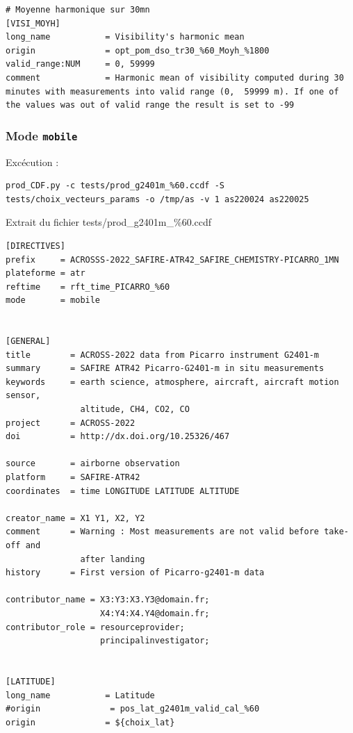 \begin{landscape}
\begin{Verbatim}[fontsize=\myfontsize, commandchars=\\\{\}]
# Moyenne harmonique sur 30mn
[VISI_MOYH]
long_name           = Visibility's harmonic mean
origin              = opt_pom_dso_tr30_%60_Moyh_%1800
valid_range:NUM     = 0, 59999
comment             = Harmonic mean of visibility computed during 30 minutes with measurements into valid range (0,  59999 m). If one of the values was out of valid range the result is set to -99
\end{Verbatim}

\subsubsection{Mode \texttt{mobile}}

Excécution :

\begin{Verbatim}[fontsize=\myfontsize, commandchars=\\\{\}]
prod_CDF.py -c tests/prod_g2401m_%60.ccdf -S tests/choix_vecteurs_params -o /tmp/as -v 1 as220024 as220025
\end{Verbatim}

Extrait du fichier tests/prod\_g2401m\_\%60.ccdf

\begin{Verbatim}[fontsize=\myfontsize, commandchars=\\\{\}]
[DIRECTIVES]
prefix     = ACROSSS-2022_SAFIRE-ATR42_SAFIRE_CHEMISTRY-PICARRO_1MN
plateforme = atr
reftime    = rft_time_PICARRO_%60
mode       = mobile


[GENERAL]
title        = ACROSS-2022 data from Picarro instrument G2401-m
summary      = SAFIRE ATR42 Picarro-G2401-m in situ measurements
keywords     = earth science, atmosphere, aircraft, aircraft motion sensor,
               altitude, CH4, CO2, CO
project      = ACROSS-2022
doi          = http://dx.doi.org/10.25326/467

source       = airborne observation
platform     = SAFIRE-ATR42
coordinates  = time LONGITUDE LATITUDE ALTITUDE

creator_name = X1 Y1, X2, Y2
comment      = Warning : Most measurements are not valid before take-off and
               after landing
history      = First version of Picarro-g2401-m data

contributor_name = X3:Y3:X3.Y3@domain.fr;
                   X4:Y4:X4.Y4@domain.fr;
contributor_role = resourceprovider;
                   principalinvestigator;


[LATITUDE]
long_name           = Latitude
#origin              = pos_lat_g2401m_valid_cal_%60
origin              = ${choix_lat}


\end{Verbatim}
\end{landscape}
